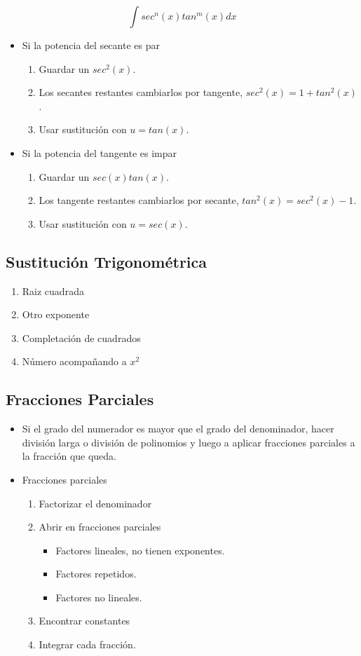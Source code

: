 $$\int sec^n(x)tan^m(x)dx$$
\begin{itemize}
	\item Si la potencia del secante es par
	\begin{enumerate}
		\item Guardar un $sec^2(x)$.
		\item Los secantes restantes cambiarlos por tangente, $sec^2(x)=1+tan^2(x)$.
		\item Usar sustitución con $u=tan(x)$.
	\end{enumerate}
	\item Si la potencia del tangente es impar
	\begin{enumerate}
		\item Guardar un $sec(x)tan(x)$.
		\item Los tangente restantes cambiarlos por secante, $tan^2(x)=sec^2(x)-1$.
		\item Usar sustitución con $u=sec(x)$.
	\end{enumerate}
	
\end{itemize}

\subsection{Sustitución Trigonométrica}
\begin{enumerate}
	\item Raiz cuadrada
	\item Otro exponente
	\item Completación de cuadrados
	\item Número acompañando a $x^2$
\end{enumerate}


\subsection{Fracciones Parciales}
\begin{itemize}
	\item Si el grado del numerador es mayor que el grado del denominador, hacer división larga o división de polinomios y luego a aplicar fracciones parciales a la fracción que queda.
	\item Fracciones parciales
	\begin{enumerate}
		\item Factorizar el denominador
		\item Abrir en fracciones parciales
		\begin{itemize}
			\item Factores lineales, no tienen exponentes.
			\item Factores repetidos.
			\item Factores no lineales.
		\end{itemize}
		\item Encontrar constantes
		\item Integrar cada fracción.
	\end{enumerate}
\end{itemize}


